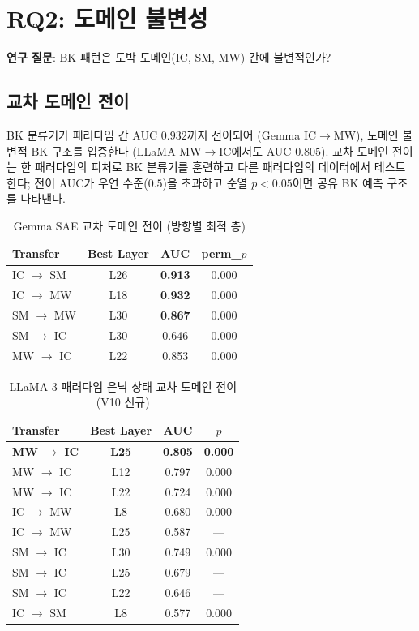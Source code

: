 \documentclass[11pt,a4paper]{article}
\begin{document}
\section{RQ2: 도메인 불변성}

\noindent\textbf{연구 질문}: BK 패턴은 도박 도메인(IC, SM, MW) 간에 불변적인가?

\subsection{교차 도메인 전이}

BK 분류기가 패러다임 간 AUC $0.932$까지 전이되어 (Gemma IC$\rightarrow$MW), 도메인 불변적 BK 구조를 입증한다 (LLaMA MW$\rightarrow$IC에서도 AUC $0.805$). 교차 도메인 전이는 한 패러다임의 피처로 BK 분류기를 훈련하고 다른 패러다임의 데이터에서 테스트한다; 전이 AUC가 우연 수준($0.5$)을 초과하고 순열 $p<0.05$이면 공유 BK 예측 구조를 나타낸다.

\begin{table}[H]
\centering
\caption{Gemma SAE 교차 도메인 전이 (방향별 최적 층)}\label{tab:t7}
\footnotesize
\begin{tabular}{lccc}
\toprule
Transfer & Best Layer & AUC & perm\_$p$ \\
\midrule
IC $\rightarrow$ SM & L26 & \textbf{0.913} & 0.000 \\
IC $\rightarrow$ MW & L18 & \textbf{0.932} & 0.000 \\
SM $\rightarrow$ MW & L30 & \textbf{0.867} & 0.000 \\
SM $\rightarrow$ IC & L30 & 0.646 & 0.000 \\
MW $\rightarrow$ IC & L22 & 0.853 & 0.000 \\
\bottomrule
\end{tabular}
\end{table}

\begin{table}[H]
\centering
\caption{LLaMA 3-패러다임 은닉 상태 교차 도메인 전이 (V10 신규)}\label{tab:t8}
\footnotesize
\begin{tabular}{lccc}
\toprule
Transfer & Best Layer & AUC & $p$ \\
\midrule
\textbf{MW $\rightarrow$ IC} & \textbf{L25} & \textbf{0.805} & \textbf{0.000} \\
MW $\rightarrow$ IC & L12 & 0.797 & 0.000 \\
MW $\rightarrow$ IC & L22 & 0.724 & 0.000 \\
IC $\rightarrow$ MW & L8 & 0.680 & 0.000 \\
IC $\rightarrow$ MW & L25 & 0.587 & --- \\
SM $\rightarrow$ IC & L30 & 0.749 & 0.000 \\
SM $\rightarrow$ IC & L25 & 0.679 & --- \\
SM $\rightarrow$ IC & L22 & 0.646 & --- \\
IC $\rightarrow$ SM & L8 & 0.577 & 0.000 \\
\bottomrule
\end{tabular}
\end{table}
\end{document}
